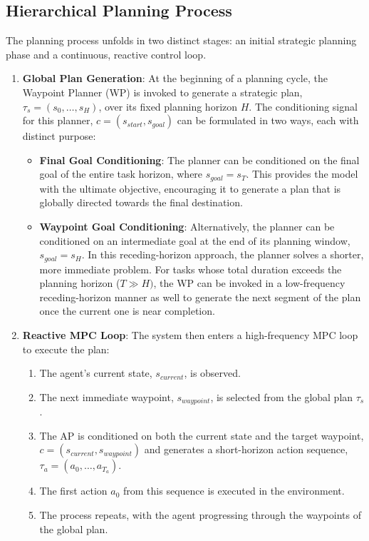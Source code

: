 \subsection{Hierarchical Planning Process}

The planning process unfolds in two distinct stages: an initial strategic planning phase and a continuous, reactive control loop.
\begin{enumerate}
	\item \textbf{Global Plan Generation}: At the beginning of a planning cycle, the Waypoint Planner (WP) is invoked to generate a strategic plan, $\tau_s=(s_0,\dots,s_H)$, over its fixed planning horizon $H$. The conditioning signal for this planner, $c = (s_{start}, s_{goal})$ can be formulated in two ways, each with distinct purpose:
	\begin{itemize}
		\item \textbf{Final Goal Conditioning}: The planner can be conditioned on the final goal of the entire task horizon, where $s_{goal} = s_T$. This provides the model with the ultimate objective, encouraging it to generate a plan that is globally directed towards the final destination.
		\item \textbf{Waypoint Goal Conditioning}: Alternatively, the planner can be conditioned on an intermediate goal at the end of its planning window, $s_{goal} = s_H$. In this receding-horizon approach, the planner solves a shorter, more immediate problem. For tasks whose total duration exceeds the planning horizon ($T \gg H)$, the WP can be invoked in a low-frequency receding-horizon manner as well to generate the next segment of the plan once the current one is near completion.
	\end{itemize}

	\item \textbf{Reactive MPC Loop}: The system then enters a high-frequency MPC loop to execute the plan:
		\begin{enumerate}	
			\item The agent's current state, $s_{current}$, is observed.
			\item The next immediate waypoint, $s_{waypoint}$, is selected from the global plan $\tau_s$.
			\item The  AP is conditioned on both the current state and the target waypoint, $c=(s_{current},s_{waypoint})$ and generates a short-horizon action sequence, $\tau_{a}=(a_0,\ldots,a_{T_{a}})$.
			\item The first action $a_0$ from this sequence is executed in the environment.
			\item The process repeats, with the agent progressing through the waypoints of the global plan.
	\end{enumerate}
\end{enumerate}
